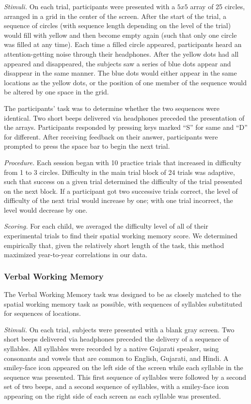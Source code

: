 \documentclass[11pt]{article}
\begin{document}
{\it Stimuli.} On each trial, participants were presented with a $5x5$ array of 25 circles, arranged in a grid in the center of the screen. After the start of the trial, a sequence of circles (with sequence length depending on the level of the trial) would fill with yellow and then become empty again (such that only one circle was filled at any time). Each time a filled circle appeared, participants heard an attention-getting noise through their headphones. After the yellow dots had all appeared and disappeared, the subjects saw a series of blue dots appear and disappear in the same manner. The blue dots would either appear in the same locations as the yellow dots, or the position of one member of the sequence would be altered by one space in the grid. 

The participants' task was to determine whether the two sequences were identical. Two short beeps delivered via headphones preceded the presentation of the arrays. Participants responded by pressing keys marked ``S'' for same and ``D'' for different. After receiving feedback on their answer, participants were prompted to press the space bar to begin the next trial. 

{\it Procedure.} Each session began with 10 practice trials that increased in difficulty from 1 to 3 circles. Difficulty in the main trial block of 24 trials was adaptive, such that success on a given trial determined the difficulty of the trial presented on the next block. If a participant got two successive trials correct, the level of difficulty of the next trial would increase by one; with one trial incorrect, the level would decrease by one. 
 
{\it Scoring.} For each child, we averaged the difficulty level of all of their experimental trials to find their spatial working memory score. We determined empirically that, given the relatively short length of the task, this method maximized year-to-year correlations in our data. 

\subsubsection{Verbal Working Memory}

The Verbal Working Memory task was designed to be as closely matched to the spatial working memory task as possible, with sequences of syllables substituted for sequences of locations. 

{\it Stimuli.} On each trial, subjects were presented with a blank gray screen. Two short beeps delivered via headphones preceded the delivery of a sequence of syllables. All syllables were recorded by a native Gujarati speaker, using consonants and vowels that are common to English, Gujarati, and Hindi. A smiley-face icon appeared on the left side of the screen while each syllable in the sequence was presented. This first sequence of syllables were followed by a second set of two beeps, and a second sequence of syllables, with a smiley-face icon appearing on the right side of each screen as each syllable was presented. 
\end{document}
